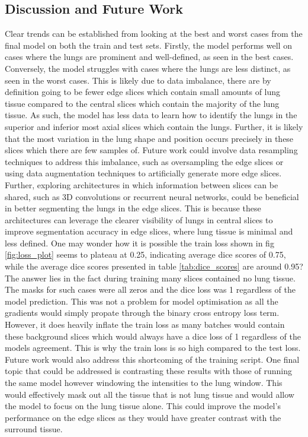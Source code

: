 \documentclass[11pt]{article}
\begin{document}
\subsection{Discussion and Future Work}
Clear trends can be established from looking at the best and worst cases from the final model on both the train and test sets.
Firstly, the model performs well on cases where the lungs are prominent and well-defined, as seen in the best cases. Conversely, the model struggles with cases where the lungs are less distinct, as seen in the worst cases. This is likely due to data imbalance, there are by definition going to be fewer edge slices which contain small amounts of lung tissue compared to the central slices which contain the majority of the lung tissue. As such, the model has less data to learn how to identify the lungs in the superior and inferior most axial slices which contain the lungs. Further, it is likely that the most variation in the lung shape and position occurs precisely in these slices which there are few samples of. Future work could involve data resampling techniques to address this imbalance, such as oversampling the edge slices or using data augmentation techniques to artificially generate more edge slices. Further, exploring architectures in which information between slices can be shared, such as 3D convolutions or recurrent neural networks, could be beneficial in better segmenting the lungs in the edge slices. This is because these architectures can leverage the clearer visibility of lungs in central slices to improve segmentation accuracy in edge slices, where lung tissue is minimal and less defined. 
One may wonder how it is possible the train loss shown in fig \ref{fig:loss_plot} seems to plateau at 0.25, indicating average dice scores of 0.75, while the average dice scores presented in table \ref{tab:dice_scores} are around 0.95? The answer lies in the fact during training many slices contained no lung tissue. The masks for such cases were all zeros and the dice loss was 1 regardless of the model prediction. This was not a problem for model optimisation as all the gradients would simply propate through the binary cross entropy loss term. However, it does heavily inflate the train loss as many batches would contain these background slices which would always have a dice loss of 1 regardless of the models agreement. This is why the train loss is so high compared to the test loss. Future work would also address this shortcoming of the training script. One final topic that could be addressed is contrasting these results with those of running the same model however windowing the intensities to the lung window. This would effectively mask out all the tissue that is not lung tissue and would allow the model to focus on the lung tissue alone. This could improve the model's performance on the edge slices as they would have greater contrast with the surround tissue.
\end{document}
